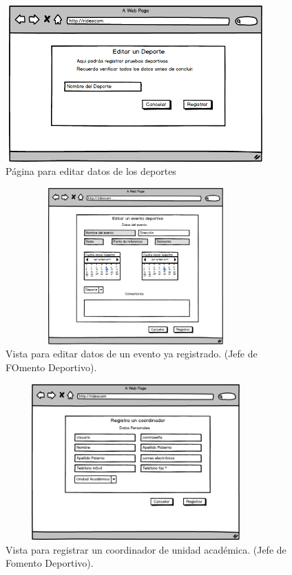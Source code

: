 		\begin{figure} [hbt!]
			\centering
			\includegraphics[width=10cm, height=6cm]{Imagenes/Nuevos/P29_EditarDeportes_JFD}
			\caption{Página para editar datos de los deportes}
			\label{editardeporte}
		\end{figure}
		\pagebreak
		
		\begin{figure} [hbt!]
			\centering
			\includegraphics[width=10cm, height=6cm]{Imagenes/Nuevos/P5_Editar_evento_deportivo}
			\caption{Vista para editar datos de un evento ya registrado. (Jefe de FOmento Deportivo).}
			\label{editarevento}
		\end{figure}
	
		\begin{figure} [hbt!]
			\centering
			\includegraphics[width=10cm, height=6cm]{Imagenes/Nuevos/P6_Registro_coordinador}
			\caption{Vista para registrar un coordinador de unidad académica. (Jefe de Fomento Deportivo).}
			\label{registrarcoord}
		\end{figure}
		
